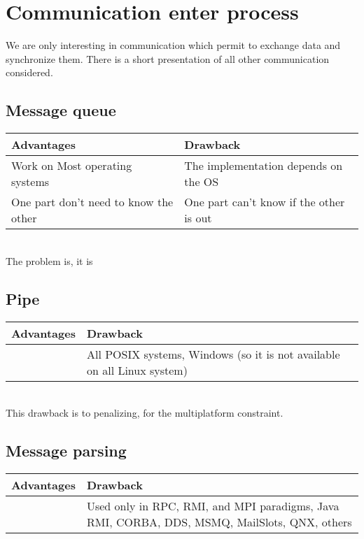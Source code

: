 
\chapter{Communication enter process}
\label{annex:choice}


We are only interesting in communication which permit to exchange data and synchronize them. There is a short presentation of all other communication considered.

\section{Message queue}

\begin{tabular}{|p{}||p{}|}
\hline
  \textbf{Advantages}&\textbf{Drawback}\\
\hline
  Work on Most operating systems&The implementation depends on the OS\\
  \hline
  One part don't need to know the other&One part can't know if the other is out\\
\hline
\end{tabular}
~\\

The problem is, it is

\section{Pipe}

\begin{tabular}{|p{}||p{}|}
\hline
  \textbf{Advantages}&\textbf{Drawback}\\
\hline
&All POSIX systems, Windows (so it is not available on all Linux system)\\
\hline
\end{tabular}
~\\

This drawback is to penalizing, for the multiplatform constraint.

\section{Message parsing}

\begin{tabular}{|p{}||p{}|}
\hline
  \textbf{Advantages}&\textbf{Drawback}\\
\hline
&Used only in RPC, RMI, and MPI paradigms, Java RMI, CORBA, DDS, MSMQ, MailSlots, QNX, others\\
\hline
\end{tabular}
~\\

